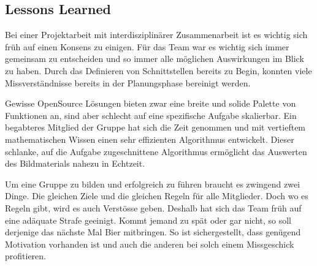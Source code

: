 \subsection{Lessons Learned}

Bei einer Projektarbeit mit interdisziplinärer Zusammenarbeit ist es wichtig sich früh auf einen Konsens zu einigen.
Für das Team war es wichtig sich immer gemeinsam zu entscheiden und so immer alle möglichen Auswirkungen im Blick zu haben.
Durch das Definieren von Schnittstellen bereits zu Begin, konnten viele Missverständnisse bereits in der Planungsphase bereinigt werden.

Gewisse OpenSource Lösungen bieten zwar eine breite und solide Palette von Funktionen an, sind aber schlecht auf eine spezifische Aufgabe skalierbar.
Ein begabteres Mitglied der Gruppe hat sich die Zeit genommen und mit vertieftem mathematischen Wissen einen sehr effizienten Algorithmus entwickelt.
Dieser schlanke, auf die Aufgabe zugeschnittene Algorithmus ermöglicht das Auswerten des Bildmaterials nahezu in Echtzeit.


Um eine Gruppe zu bilden und erfolgreich zu führen braucht es zwingend zwei Dinge.
Die gleichen Ziele und die gleichen Regeln für alle Mitglieder.
Doch wo es Regeln gibt, wird es auch Verstösse geben. Deshalb hat sich das Team früh auf eine adäquate Strafe geeinigt.
Kommt jemand zu spät oder gar nicht, so soll derjenige das nächste Mal Bier mitbringen.
So ist sichergestellt, dass genügend Motivation vorhanden ist und auch die anderen bei solch einem Missgeschick profitieren.